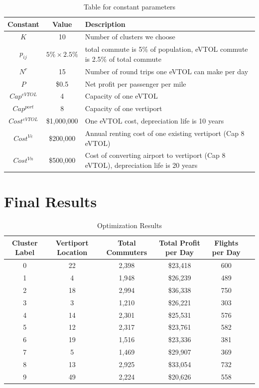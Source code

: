 \documentclass{article}
\begin{document}
\begin{table}[h!]
\centering
\caption{Table for constant parameters}
\begin{tabular}{|c c l|} 
 \hline
 Constant & Value & Description \\ [0.5ex] 
 \hline\hline
 $K$ & 10 & Number of clusters we choose \\
 $p_{ij}$ & $5\%\times 2.5\%$ & total commute is 5\% of population, eVTOL commute is 2.5\% of total commute \\
 $N^r$ & 15 & Number of round trips one eVTOL can make per day\\
 $P$ & \$0.5 & Net profit per passenger per mile \\ 
 $Cap^{eVTOL}$ & 4 & Capacity of one eVTOL\\
 $Cap^{port}$ & 8 & Capacity of one vertiport\\
 $Cost^{eVTOL}$ & \$1,000,000 & One eVTOL cost, depreciation life is 10 years\\
 $Cost^{Ve}$ & \$200,000 & Annual renting cost of one existing vertiport (Cap 8 eVTOL) \\
 $Cost^{Vn}$ & \$500,000 & Cost of converting airport to vertiport (Cap 8 eVTOL), depreciation life is 20 years \\ [1ex] 
 \hline
\end{tabular}
\label{table:proj01}
\end{table}

\section{Final Results}

\begin{table}[h!]
\centering
\caption{Optimization Results}
\begin{tabular}{|c c c c c c|} 
 \hline
Cluster Label& Vertiport Location&	Total Commuters&	Total Profit per Day&		Flights per Day \\ [0.5ex] 
 \hline\hline
0&	22	& 2,398& \$23,418	&  600 \\
1&	4&	1,948&	\$26,239&		489\\
2&	18&	2,994&	\$36,338&		750\\
3&	3&	1,210&	\$26,221&		303\\
4&	14&	2,301&	\$25,531&		576\\
5&	12&	2,317&	\$23,761&		582\\
6&	19&	1,516&	\$23,336&		381\\
7&	5&	1,469&	\$29,907&		369\\
8&	13&	2,925&	\$33,054&		732\\
9&	49&	2,224&	\$20,626&		558\\ [1ex] 
 \hline
\end{tabular}
\label{table:proj02}
\end{table}
\end{document}
